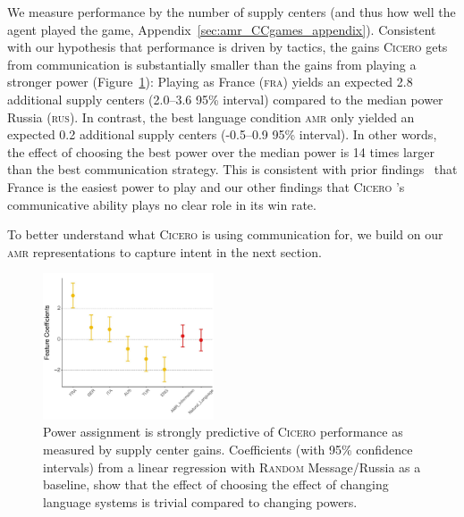 \documentclass[oneside]{memoir}
\newcommand{\cicero}{\abr{Cicero} }
\newcommand{\abr}[1]{\textsc{#1}}
\begin{document}
We measure performance by the number of supply centers (and thus how well the agent played the game, Appendix~\ref{sec:amr_CCgames_appendix}).
%
Consistent with our hypothesis that performance is driven by tactics, the gains \cicero{} gets from communication is substantially smaller than the gains from playing a stronger power (Figure~\ref{fig:Feature_coef}):
%
Playing as France (\abr{fra}) yields an expected 2.8 additional supply centers (2.0--3.6 95\% interval)  compared to the median power Russia (\abr{rus}). In contrast, the best language condition \abr{amr} only yielded an expected 0.2 additional supply centers (-0.5--0.9 95\% interval). In other words, the effect of choosing the best power over the median power is 14 times larger than the best communication strategy.
%
This is consistent with prior findings~\citep{sharp1978game} that France is the easiest power to play and our other findings that \cicero{}'s  communicative ability plays no clear role in its win rate.
%
%
%

To better understand what \cicero{} is using communication for, we build on our \abr{amr} representations to capture intent in the next section.



\begin{figure}[t]
    \centering
    \includegraphics[width=0.45\textwidth]{figures/Feature_Coefficients_CC_final.pdf}
    \caption{Power assignment is strongly predictive of \cicero{} performance as measured by supply center gains. Coefficients (with 95\% confidence intervals) from a linear regression with \abr{Random} Message/Russia as a baseline, show that the effect of choosing the effect of changing language systems is trivial compared to changing powers.}
\label{fig:Feature_coef}
\end{figure}
\end{document}
